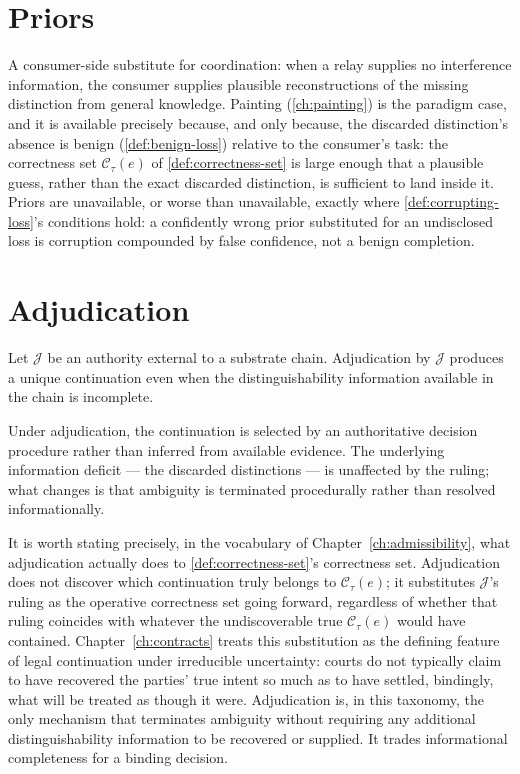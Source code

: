 \section{Priors}
\label{sec:coord-priors}

A consumer-side substitute for coordination: when a relay supplies no
interference information, the consumer supplies plausible reconstructions
of the missing distinction from general knowledge. Painting
(\cref{ch:painting}) is the paradigm case, and it is available precisely
because, and only because, the discarded distinction's absence is benign
(\cref{def:benign-loss}) relative to the consumer's task: the correctness
set $\mathcal{C}_\tau(e)$ of \cref{def:correctness-set} is large enough
that a plausible guess, rather than the exact discarded distinction, is
sufficient to land inside it. Priors are unavailable, or worse than
unavailable, exactly where \cref{def:corrupting-loss}'s conditions hold:
a confidently wrong prior substituted for an undisclosed loss is
corruption compounded by false confidence, not a benign completion.

\section{Adjudication}
\label{sec:coord-adjudication}

\begin{proposition}
\label{prop:adjudication}
Let $\mathcal{J}$ be an authority external to a substrate chain.
Adjudication by $\mathcal{J}$ produces a unique continuation even when the
distinguishability information available in the chain is incomplete.
\end{proposition}

\begin{proofsketch}
Under adjudication, the continuation is selected by an authoritative
decision procedure rather than inferred from available evidence. The
underlying information deficit --- the discarded distinctions --- is
unaffected by the ruling; what changes is that ambiguity is terminated
procedurally rather than resolved informationally.
\end{proofsketch}

It is worth stating precisely, in the vocabulary of
Chapter~\ref{ch:admissibility}, what adjudication actually does to
\cref{def:correctness-set}'s correctness set. Adjudication does not
discover which continuation truly belongs to $\mathcal{C}_\tau(e)$; it
substitutes $\mathcal{J}$'s ruling as the operative correctness set going
forward, regardless of whether that ruling coincides with whatever the
undiscoverable true $\mathcal{C}_\tau(e)$ would have contained.
Chapter~\ref{ch:contracts} treats this substitution as the defining
feature of legal continuation under irreducible uncertainty: courts do
not typically claim to have recovered the parties' true intent so much as
to have settled, bindingly, what will be treated as though it were.
Adjudication is, in this taxonomy, the only mechanism that terminates
ambiguity without requiring any additional distinguishability information
to be recovered or supplied. It trades informational completeness for a
binding decision.

